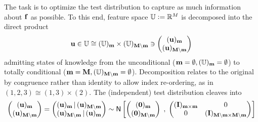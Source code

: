 \documentclass[a4paper, margin=1in, reqno]{RAMArticle}
\begin{document}
	The task is to optimize the test distribution to capture as much information about \(\mathbf{f}\) as possible. 
	To this end, feature space \(\mathbb{U} \mathrel{\mathop:}= \mathbb{R}^{M}\) is decomposed into the direct product
	\begin{equation*}
		\mathbf{u} \in \mathbb{U} \cong (\mathbb{U})_{\mathbf{m}} \times (\mathbb{U})_{\mathbf{M}\setminus\mathbf{m}} \ni
		\begin{pmatrix}
			(\mathbf{u})_{\mathbf{m}} \\ (\mathbf{u})_{\mathbf{M}\setminus\mathbf{m}}
		\end{pmatrix}
	\end{equation*}
	admitting states of knowledge from the unconditional (\(\mathbf{m}=\emptyset, (\mathbb{U})_{\mathbf{m}}=\emptyset\)) 
	to totally conditional (\(\mathbf{m}=\mathbf{M},(\mathbb{U})_{\mathbf{M}\setminus\mathbf{m}}=\emptyset\)). 
	Decomposition relates to the original by congruence rather than identity to allow index re-ordering, as in \((1,2,3) \cong (1,3)\times (2)\).
	The (independent) test distribution cleaves into
	\begin{equation*}
		\begin{pmatrix}
			(\mathbf{u})_{\mathbf{m}} \\ (\mathbf{u})_{\mathbf{M}\setminus\mathbf{m}}
		\end{pmatrix}
		=
		\begin{pmatrix}
		(\mathbf{u})_{\mathbf{m}} \,\vert\, (\mathbf{u})_{\mathbf{M}\setminus\mathbf{m}} \\ (\mathbf{u})_{\mathbf{M}\setminus\mathbf{m}} \,\vert\, (\mathbf{u})_{\mathbf{m}}
	\end{pmatrix}
		\sim \mathsf{N} \left\lbrack
		\begin{pmatrix}
			(\mathbf{0})_{\mathbf{m}} \\ (\mathbf{0})_{\mathbf{M}\setminus\mathbf{m}}
		\end{pmatrix}
		\; , \;
		\begin{pmatrix}
			(\mathbf{I})_{\mathbf{m}\times\mathbf{m}} & 0 \\
			0 & (\mathbf{I})_{\mathbf{M}\setminus\mathbf{m} \times \mathbf{M}\setminus\mathbf{m}}
		\end{pmatrix}
		\right\rbrack
	\end{equation*}
\end{document}
